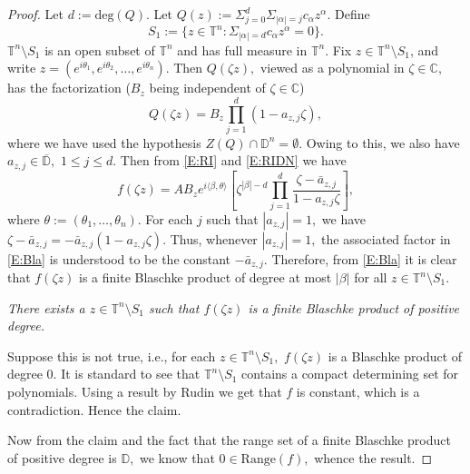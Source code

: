 \documentclass[11pt, reqno]{amsart}
\numberwithin{equation}{section}
\theoremstyle{definition}
\theoremstyle{remark}
\theoremstyle{plain}
\begin{document}
\begin{proof}
Let $d:=\text{deg}(Q).$ Let $Q(z):=\Sigma_{j=0}^{d}\Sigma_{|\alpha|=j} c_{\alpha}z^{\alpha}.$
Define
\[
S_1:=\{z\in\mathbb{T}^n:\Sigma_{|\alpha|=d} c_{\alpha}z^{\alpha}=0\}.
\]
$\mathbb{T}^{n}\setminus{S_1}$ is an open subset of $\mathbb{T}^n$
and has full measure in $\mathbb{T}^n.$
Fix $z\in\mathbb{T}^n\setminus{S_1}$, and write
$z=(e^{i{\theta}_1},e^{i{\theta}_2},\ldots,e^{i{\theta}_n}).$
Then $Q({\zeta} z),$ viewed as a polynomial in ${\zeta}\in{\mathbb{C}},$ has the factorization ($B_{z}$ being independent of $\zeta\in{\mathbb{C}}$)
\begin{equation}
Q({\zeta} z)= B_z\prod_{j=1}^{d}(1-a_{z,j}{\zeta}),\label{E:RIDN}
\end{equation}
where we have used the hypothesis $Z(Q)\cap\mathbb{D}^n=\emptyset.$ Owing to this,
we also have $a_{z,j}\in\overline{\mathbb{D}},\,\,1\leq j\leq d.$
Then from \eqref{E:RI} and \eqref{E:RIDN} we have
\begin{equation}
f({\zeta} z)=AB_ze^{i\langle\beta,{\theta}\rangle}\left[{\zeta}^{|\beta|-d}\prod_{j=1}^{d}
\frac{{\zeta}-\bar{a}_{z,j}}{1-a_{z,j}{\zeta}}\right],\label{E:Bla}
\end{equation}
where ${\theta}:=({\theta}_1,\ldots,{\theta}_n).$
For each $j$ such that $|a_{z,j}|=1,$ we have ${\zeta}-\bar{a}_{z,j}=-\bar{a}_{z,j}(1-a_{z,j}{\zeta}).$
Thus, whenever $|a_{z,j}|=1,$ the associated factor in \eqref{E:Bla} is
understood to be the constant $-\bar{a}_{z,j}.$ Therefore, from \eqref{E:Bla} it is clear that
$f({\zeta} z)$ is a finite Blaschke product of degree at most $|\beta|$ for all
$z\in\mathbb{T}^n\setminus{S_1}.$
\smallskip

 {\em There exists a $z\in\mathbb{T}^n\setminus{S_1}$ such that $f({\zeta} z)$ is
a finite Blaschke product of positive degree.}

\noindent Suppose this is not true, i.e., for each $z\in\mathbb{T}^n\setminus{S_1},$
$f({\zeta} z)$ is a  Blaschke product of degree $0$. It is standard to see that
$\mathbb{T}^n\setminus{S_1}$ contains a compact determining set for polynomials. 
Using a result by Rudin \cite[Theorem~5.2.2]{rudin:ftp69} we get that $f$ is constant, which is a contradiction.
Hence the claim.
\smallskip

Now from the claim and the fact that the range set of a finite Blaschke product of positive degree is 
${\mathbb{D}},$ we know that $0\in \text{Range}(f),$ whence the result.
\end{proof}
\smallskip
\end{document}
